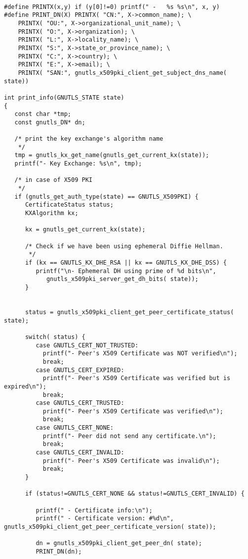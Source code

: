 \begin{verbatim}

#define PRINTX(x,y) if (y[0]!=0) printf(" -   %s %s\n", x, y)
#define PRINT_DN(X) PRINTX( "CN:", X->common_name); \
	PRINTX( "OU:", X->organizational_unit_name); \
	PRINTX( "O:", X->organization); \
	PRINTX( "L:", X->locality_name); \
	PRINTX( "S:", X->state_or_province_name); \
	PRINTX( "C:", X->country); \
	PRINTX( "E:", X->email); \
	PRINTX( "SAN:", gnutls_x509pki_client_get_subject_dns_name( state))

int print_info(GNUTLS_STATE state)
{
   const char *tmp;
   const gnutls_DN* dn;

   /* print the key exchange's algorithm name
    */
   tmp = gnutls_kx_get_name(gnutls_get_current_kx(state));
   printf("- Key Exchange: %s\n", tmp);

   /* in case of X509 PKI
    */
   if (gnutls_get_auth_type(state) == GNUTLS_X509PKI) {
      CertificateStatus status;
      KXAlgorithm kx;

      kx = gnutls_get_current_kx(state);

      /* Check if we have been using ephemeral Diffie Hellman.
       */
      if (kx == GNUTLS_KX_DHE_RSA || kx == GNUTLS_KX_DHE_DSS) {
         printf("\n- Ephemeral DH using prime of %d bits\n",
            gnutls_x509pki_server_get_dh_bits( state));
      }


      status = gnutls_x509pki_client_get_peer_certificate_status( state);

      switch( status) {
         case GNUTLS_CERT_NOT_TRUSTED:
           printf("- Peer's X509 Certificate was NOT verified\n");
           break;
         case GNUTLS_CERT_EXPIRED:
           printf("- Peer's X509 Certificate was verified but is expired\n");
           break;
         case GNUTLS_CERT_TRUSTED:
           printf("- Peer's X509 Certificate was verified\n");
           break;
         case GNUTLS_CERT_NONE:
           printf("- Peer did not send any certificate.\n");
           break;
         case GNUTLS_CERT_INVALID:
           printf("- Peer's X509 Certificate was invalid\n");
           break;
      }
		
      if (status!=GNUTLS_CERT_NONE && status!=GNUTLS_CERT_INVALID) {

         printf(" - Certificate info:\n");
         printf(" - Certificate version: #%d\n", gnutls_x509pki_client_get_peer_certificate_version( state));

         dn = gnutls_x509pki_client_get_peer_dn( state);
         PRINT_DN(dn);


\end{verbatim}
